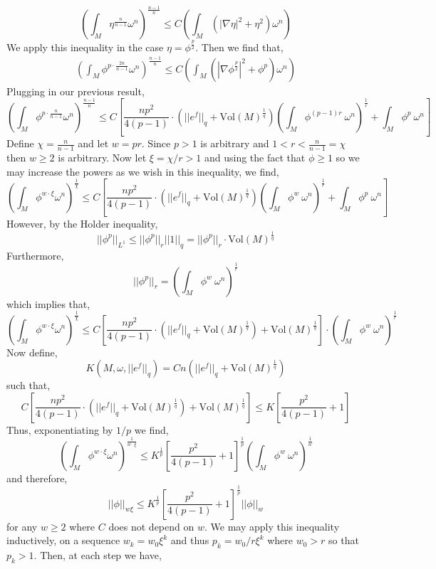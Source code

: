 \documentclass[12pt]{extarticle}
\theoremstyle{definition}
\newcommand{\Vol}[1]{\mathrm{Vol}\left(#1\right)}
\begin{document}
\[ \left( \int_M \eta^{\frac{n}{n-1}} \omega^n \right)^{\frac{n-1}{n}} \le C \left( \int_M \left( |\nabla \eta|^2 + \eta^2 \right) \omega^n \right) \]
We apply this inequality in the case $\eta = \phi^{\frac{p}{2}}$. Then we find that,
\begin{align*}
\left( \int_M \phi^{p \cdot \frac{2n}{n-1}} \omega^n \right)^{\frac{n-1}{n}} \le C \left( \int_M \left( | \nabla \phi^{\frac{p}{2}} |^2 + \phi^p \right) \omega^n \right) 
\end{align*}
Plugging in our previous result,
\[ \left( \int_M \phi^{p \cdot \frac{n}{n-1}} \omega^n \right)^{\frac{n-1}{n}} \le C \left[ \frac{n p^2}{4 (p - 1)} \cdot ( || e^f ||_q + \Vol{M}^{\frac{1}{q}}) \left( \int_M \phi^{(p - 1)r} \: \omega^n \right)^{\frac{1}{r}} + \int_M \phi^p \: \omega^n \right] \]
Define $\chi = \frac{n}{n-1}$ and let $w = pr$. Since $p > 1$ is arbitrary and $1 < r < \frac{n}{n - 1} = \chi$ then $w \ge 2$ is arbitrary. Now let $\xi = \chi / r > 1$ and using the fact that $\phi \ge 1$ so we may increase the powers as we wish in this inequality, we find,
\[ \left( \int_M \phi^{w \cdot \xi} \omega^n \right)^{\frac{1}{\chi}} \le C \left[ \frac{n p^2}{4 (p - 1)} \cdot ( || e^f ||_q + \Vol{M}^{\frac{1}{q}}) \left( \int_M \phi^{w} \: \omega^n \right)^{\frac{1}{r}} + \int_M \phi^p \: \omega^n \right] \]
However, by the Holder inequality,
\[ || \phi^p ||_{L^1} \le || \phi^p ||_{r} || 1 ||_q = || \phi^p ||_r \cdot \Vol{M}^{\frac{1}{q}} \]
Furthermore,
\[ || \phi^p ||_r = \left( \int_M \phi^{w} \: \omega^n \right)^{\frac{1}{r}} \]
which implies that,
\[ \left( \int_M \phi^{w \cdot \xi} \omega^n \right)^{\frac{1}{\chi}} \le C \left[ \frac{n p^2}{4 (p - 1)} \cdot ( || e^f ||_q + \Vol{M}^{\frac{1}{q}}) + \Vol{M}^{\frac{1}{q}} \right] \cdot \left( \int_M \phi^{w} \: \omega^n \right)^{\frac{1}{r}}  \]
Now define,
\[ K(M, \omega, || e^f ||_q) =C n ( || e^f ||_q + \Vol{M}^{\frac{1}{q}}) \]
such that,
\[ C \left[ \frac{n p^2}{4 (p - 1)} \cdot ( || e^f ||_q + \Vol{M}^{\frac{1}{q}}) + \Vol{M}^{\frac{1}{q}} \right] \le K \left[ \frac{p^2}{4(p - 1)} + 1 \right]  \]
Thus, exponentiating by $1/p$ we find,
\[ \left( \int_M \phi^{w \cdot \xi} \omega^n \right)^{\frac{1}{w \cdot \xi}} \le K^{\frac{1}{p}} \left[ \frac{p^2}{4(p - 1)} + 1 \right]^{\frac{1}{p}} \left( \int_M \phi^{w} \: \omega^n \right)^{\frac{1}{w}}  \]
and therefore,
\[ || \phi ||_{w \xi} \le K^{\frac{1}{p}} \left[ \frac{p^2}{4(p - 1)} + 1 \right]^{\frac{1}{p}} || \phi ||_{w} \]
for any $w \ge 2$ where $C$ does not depend on $w$. 
We may apply this inequality inductively, on a sequence $w_k = w_0 \xi^k$ and thus $p_k = w_0/r \xi^k$ where $w_0 > r$ so that $p_k > 1$. Then, at each step we have,
\end{document}
